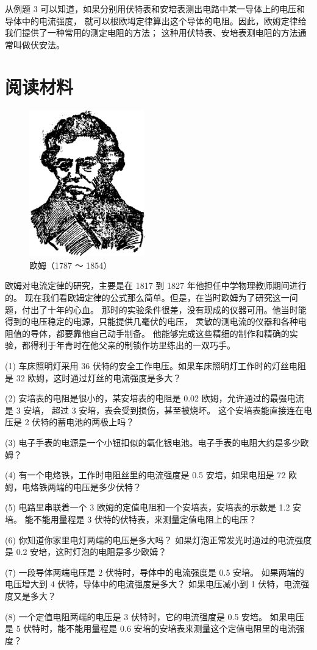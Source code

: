 从例题 3 可以知道，如果分别用伏特表和安培表测出电路中某一导体上的电压和导体中的电流强度，
就可以根欧坶定律算出这个导体的电阻。因此，欧姆定律给我们提供了一种常用的测定电阻的方法；
这种用伏特表、安培表测电阻的方法通常叫做伏安法。


\section*{阅读材料}

\begin{figure}
    \centering
    \includegraphics[width=5cm]{../pic/czwl2-ch8-ohm}
    \caption*{欧姆（1787 ～ 1854）}\label{fig:8-ohm}
\end{figure}

欧姆对电流定律的研究，主要是在 1817 到 1827 年他担任中学物理教师期间进行的。
现在我们看欧姆定律的公式那么简单。但是，在当时欧姆为了研究这一问题，付出了十年的心血。
那时的实验条件很差，没有现成的仪器可用。他当时能得到的电压稳定的电源，只能提供几毫伏的电压，
灵敏的测电流的仪器和各种电阻值的导体，都要靠他自己动手制备。
他能够完成这些精细的制作和精确的实验，都得利于年青时在他父亲的制锁作坊里练出的一双巧手。


\lianxi

(1) 车床照明灯采用 36 伏特的安全工作电压。如果车床照明灯工作时的灯丝电阻是 32 欧姆，这时通过灯丝的电流强度是多大？

(2) 安培表的电阻是很小的，某安培表的电阻是 0.02 欧姆，允许通过的最强电流是 3 安培，
超过 3 安培，表会受到损伤，甚至被烧坏。
这个安培表能直接连在电压是 2 伏特的蓄电池的两极上吗？

(3) 电子手表的电源是一个小钮扣似的氧化银电池。电子手表的电阻大约是多少欧姆？

(4) 有一个电烙铁，工作时电阻丝里的电流强度是 0.5 安培，如果电阻是 72 欧姆，电烙铁两端的电压是多少伏特？

(5) 电路里串联着一个 3 欧姆的定值电阻和一个安培表，安培表的示数是 1.2 安培。
能不能用量程是 3 伏特的伏特表，来测量定值电阻上的电压？

(6) 你知道你家里电灯两端的电压是多大吗？
如果灯泡正常发光时通过的电流强度是 0.2 安培，这时灯泡的电阻是多少欧姆？

(7) 一段导体两端电压是 2 伏特时，导体中的电流强度是 0.5 安培。
如果两端的电压增大到 4 伏特，导体中的电流强度是多大？
如果电压减小到 1 伏特，电流强度又是多大？

(8) 一个定值电阻两端的电压是 3 伏特时，它的电流强度是 0.5 安培。
如果电压是 5 伏特时，能不能用量程是 0.6 安培的安培表来测量这个定值电阻里的电流强度？

